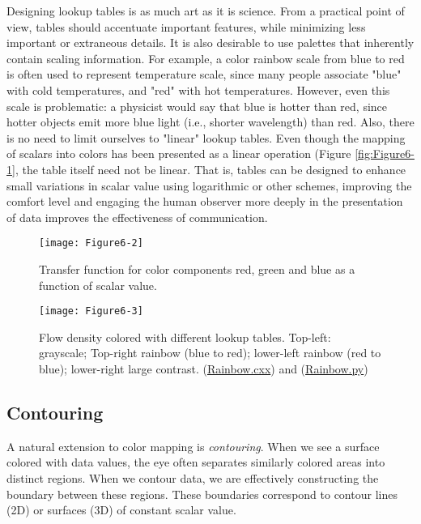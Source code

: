 Designing lookup tables is as much art as it is science. From a practical point of view, tables should accentuate important features, while minimizing less important or extraneous details. It is also desirable to use palettes that inherently contain scaling information. For example, a color rainbow scale from blue to red is often used to represent temperature scale, since many people associate "blue" with cold temperatures, and "red" with hot temperatures. However, even this scale is problematic: a physicist would say that blue is hotter than red, since hotter objects emit more blue light (i.e., shorter wavelength) than red. Also, there is no need to limit ourselves to "linear" lookup tables. Even though the mapping of scalars into colors has been presented as a linear operation (Figure \ref{fig:Figure6-1}, the table itself need not be linear. That is, tables can be designed to enhance small variations in scalar value using logarithmic or other schemes, improving the comfort level and engaging the human observer more deeply in the presentation of data improves the effectiveness of communication.

\begin{figure}[!htb]
	\centering
	\texttt{[image: Figure6-2]}
	\caption{Transfer function for color components red, green and blue as a function of scalar value.}
	\label{fig:Figure6-2}
\end{figure}

\begin{figure}[!htb]
	\centering
	\texttt{[image: Figure6-3]}
	\caption{Flow density colored with different lookup tables. Top-left: grayscale; Top-right rainbow (blue to red); lower-left rainbow (red to blue); lower-right large contrast. (\href{https://lorensen.github.io/VTKExamples/site/Cxx/Rendering/Rainbow/}{Rainbow.cxx}) and (\href{https://lorensen.github.io/VTKExamples/site/Python/Rendering/Rainbow/}{Rainbow.py})}
	\label{fig:Figure6-3}
\end{figure}

\subsection{Contouring}
\label{subsec:contouring}

A natural extension to color mapping is \emph{contouring}. When we see a surface colored with data values, the eye often separates similarly colored areas into distinct regions. When we contour data, we are effectively constructing the boundary between these regions. These boundaries correspond to contour lines (2D) or surfaces (3D) of constant scalar value.

